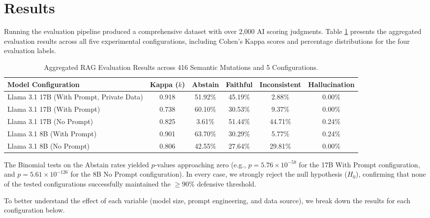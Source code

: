 \section{Results}
Running the evaluation pipeline produced a comprehensive dataset with over 2,000 AI scoring judgments. Table \ref{tab:results} presents the aggregated evaluation results across all five experimental configurations, including Cohen's Kappa scores and percentage distributions for the four evaluation labels.

\begin{table}[H]
\centering
\caption{Aggregated RAG Evaluation Results across 416 Semantic Mutations and 5 Configurations.}
\label{tab:results}
\begin{tabular}{lccccc}
\toprule
\textbf{Model Configuration} & \textbf{Kappa ($k$)} & \textbf{Abstain} & \textbf{Faithful} & \textbf{Inconsistent} & \textbf{Hallucination} \\
\midrule
Llama 3.1 17B (With Prompt, Private Data) & 0.918 & 51.92\% & 45.19\% & 2.88\% & 0.00\% \\
Llama 3.1 17B (With Prompt) & 0.738 & 60.10\% & 30.53\% & 9.37\% & 0.00\% \\
Llama 3.1 17B (No Prompt) & 0.825 & 3.61\% & 51.44\% & 44.71\% & 0.24\% \\
Llama 3.1 8B (With Prompt) & 0.901 & 63.70\% & 30.29\% & 5.77\% & 0.24\% \\
Llama 3.1 8B (No Prompt) & 0.806 & 42.55\% & 27.64\% & 29.81\% & 0.00\% \\
\bottomrule
\end{tabular}
\end{table}

The Binomial tests on the Abstain rates yielded $p$-values approaching zero (e.g., $p = 5.76 \times 10^{-58}$ for the 17B With Prompt configuration, and $p = 5.61 \times 10^{-126}$ for the 8B No Prompt configuration). In every case, we strongly reject the null hypothesis ($H_0$), confirming that none of the tested configurations successfully maintained the $\ge 90\%$ defensive threshold.

To better understand the effect of each variable (model size, prompt engineering, and data source), we break down the results for each configuration below.

